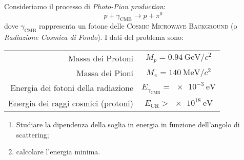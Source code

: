 \begin{example}
  Consideriamo il processo di \textit{Photo-Pion production}:
  \begin{equation}
    p + \gamma _\text{CMB} \rightarrow p + \pi^0
  \end{equation}
  dove $\gamma _\text{CMB}$ rappresenta un fotone delle \textsc{Cosmic
  Microwave Background} (o \textit{Radiazione Cosmica di Fondo}).
  I dati del problema sono:
  \begin{table}[h!]
    \centering
    \begin{tabular}{r|c}
      Massa dei Protoni & $M_p = \qty{0.94}{\GeV \per c^2}$
      \\
      Massa dei Pioni & $M _{\pi} = \qty{140}{\MeV \per c^2}$
      \\
      Energia dei fotoni della radiazione & $E _{\gamma _\text{CMB}} =
      \qty{e-3}{\eV}$
      \\
      Energia dei raggi cosmici (protoni) & $E _\text{CR} > \qty{e18}{\eV}$
    \end{tabular}
  \end{table}

  \begin{enumerate}
    \item Studiare la dipendenza della soglia in energia in funzione
      dell'angolo di scattering;
    \item calcolare l'energia minima.
  \end{enumerate}


\end{example}
